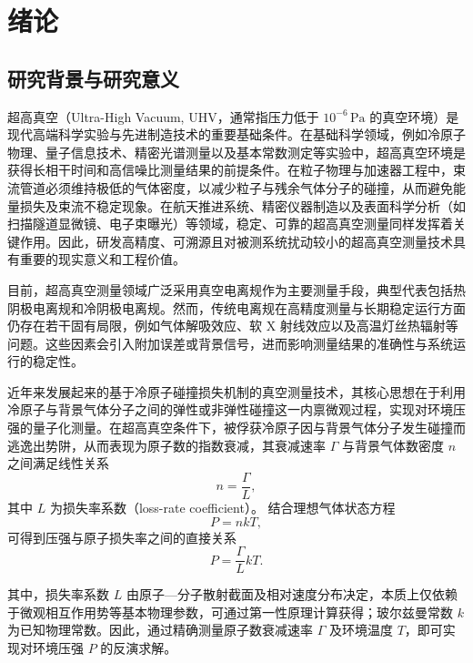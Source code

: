 \chapter{绪论}
\label{chap:1}
\section{研究背景与研究意义}

超高真空（Ultra-High Vacuum, UHV，通常指压力低于 $10^{-6}\,\mathrm{Pa}$ 的真空环境）是现代高端科学实验与先进制造技术的重要基础条件\cite{arpornthipVacuumpressureMeasurementUsing2012,成永军基于7Li冷原子操控的超高真空测量2024,贾文杰基于冷原子的量子真空计量技术研究进展2021,张苏钊基于磁光阱中6Li冷原子的真空度测量2022}。在基础科学领域，例如冷原子物理、量子信息技术、精密光谱测量以及基本常数测定等实验中，超高真空环境是获得长相干时间和高信噪比测量结果的前提条件\cite{barkerAccurateMeasurementLoss2023}。在粒子物理与加速器工程中，束流管道必须维持极低的气体密度，以减少粒子与残余气体分子的碰撞，从而避免能量损失及束流不稳定现象\cite{barkerPreciseQuantumMeasurement2022}。在航天推进系统、精密仪器制造以及表面科学分析（如扫描隧道显微镜、电子束曝光）等领域，稳定、可靠的超高真空测量同样发挥着关键作用\cite{barkerPreciseQuantumMeasurement2022}。因此，研发高精度、可溯源且对被测系统扰动较小的超高真空测量技术具有重要的现实意义和工程价值。

目前，超高真空测量领域广泛采用真空电离规作为主要测量手段，典型代表包括热阴极电离规和冷阴极电离规。然而，传统电离规在高精度测量与长期稳定运行方面仍存在若干固有局限，例如气体解吸效应、软 X 射线效应以及高温灯丝热辐射等问题\cite{bayardExtensionLowPressure1950}。这些因素会引入附加误差或背景信号，进而影响测量结果的准确性与系统运行的稳定性。

近年来发展起来的基于冷原子碰撞损失机制的真空测量技术，其核心思想在于利用冷原子与背景气体分子之间的弹性或非弹性碰撞这一内禀微观过程，实现对环境压强的量子化测量。在超高真空条件下，被俘获冷原子因与背景气体分子发生碰撞而逃逸出势阱，从而表现为原子数的指数衰减，其衰减速率 $\Gamma$ 与背景气体数密度 $n$ 之间满足线性关系
\[
n = \frac{\Gamma}{L},
\]
其中 $L$ 为损失率系数（loss-rate coefficient）。
结合理想气体状态方程
\[
P = nkT,
\]
可得到压强与原子损失率之间的直接关系\cite{barkerPreciseQuantumMeasurement2022}
\[
P = \frac{\Gamma}{L} k T.
\]

其中，损失率系数 $L$ 由原子—分子散射截面及相对速度分布决定，本质上仅依赖于微观相互作用势等基本物理参数，可通过第一性原理计算获得；玻尔兹曼常数 $k$ 为已知物理常数。因此，通过精确测量原子数衰减速率 $\Gamma$ 及环境温度 $T$，即可实现对环境压强 $P$ 的反演求解。

